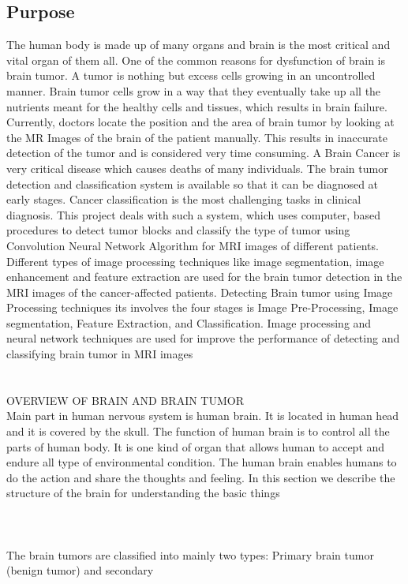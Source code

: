 \documentclass{article}
\begin{document}
\subsection{Purpose}
\thispagestyle{empty}

\doublespace

\qquad 

The human body is made up of many organs and brain is the most critical and vital organ of them all.
One of the common reasons for dysfunction of brain is brain tumor. A tumor is nothing but excess cells
growing in an uncontrolled manner. Brain tumor cells grow in a way that they eventually take up all the
nutrients meant for the healthy cells and tissues, which results in brain failure. Currently, doctors locate
the position and the area of brain tumor by looking at the MR Images of the brain of the patient manually.
This results in inaccurate detection of the tumor and is considered very time consuming. A Brain Cancer
is very critical disease which causes deaths of many individuals. The brain tumor detection and
classification system is available so that it can be diagnosed at early stages. Cancer classification is the
most challenging tasks in clinical diagnosis. This project deals with such a system, which uses computer,
based procedures to detect tumor blocks and classify the type of tumor using Convolution Neural Network
Algorithm for MRI images of different patients. Different types of image processing techniques like
image segmentation, image enhancement and feature extraction are used for the brain tumor detection in
the MRI images of the cancer-affected patients. Detecting Brain tumor using Image Processing techniques
its involves the four stages is Image Pre-Processing, Image segmentation, Feature Extraction, and
Classification. Image processing and neural network techniques are used for improve the performance of
detecting and classifying brain tumor in MRI images\\\\\\
OVERVIEW OF BRAIN AND BRAIN TUMOR\\ Main part in human nervous system is human brain. It
is located in human head and it is covered by the skull. The function of human brain is to control all the
parts of human body. It is one kind of organ that allows human to accept and endure all type of
environmental condition. The human brain enables humans to do the action and share the thoughts and
feeling. In this section we describe the structure of the brain for understanding the basic things\\\\\\\\The brain tumors are classified into mainly two types: Primary brain tumor (benign tumor) and secondary
\end{document}
